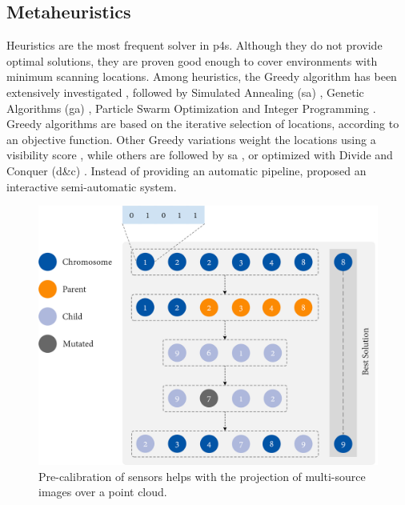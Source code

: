 \subsection{Metaheuristics}

Heuristics are the most frequent solver in \acrshort{p4s}. Although they do not provide optimal solutions, they are proven good enough to cover environments with minimum scanning locations. Among heuristics, the Greedy algorithm has been extensively investigated \cite{zhang_rapid_2016, giorgini_sensor-based_2019, heidari_mozaffar_optimal_2016}, followed by Simulated Annealing (\acrshort{sa}) \cite{chen_indoor_2018}, Genetic Algorithms (\acrshort{ga}) \cite{jia_comparison_2017}, Particle Swarm Optimization \cite{jia_comparison_2017} and Integer Programming \cite{wakisaka_optimal_2019}. Greedy algorithms are based on the iterative selection of locations, according to an objective function. Other Greedy variations weight the locations using a visibility score \cite{jia_comparison_2017}, while others are followed by \acrshort{sa} \cite{latimer_sensor_2004}, or optimized with Divide and Conquer (\acrshort{d&c}) \cite{zhang_rapid_2016}. Instead of providing an automatic pipeline, \cite{ahn_interactive_2016} proposed an interactive semi-automatic system.

\begin{figure}[ht]
	\includegraphics[width=\linewidth]{figs/context/genetic_algorithm.png}
	\caption{Pre-calibration of sensors helps with the projection of multi-source images over a point cloud.}
    \label{fig:genetic_algorithm}
\end{figure}

